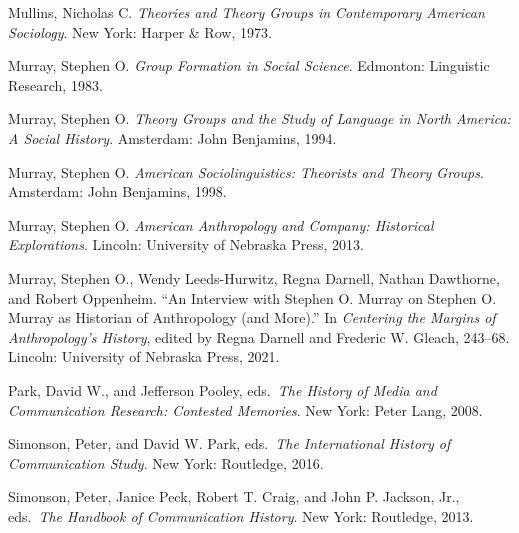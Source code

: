 \documentclass{tufte-handout}
\begin{document}
\begin{hangparas}{.25in}{1}
Mullins, Nicholas C. \emph{Theories and Theory Groups in Contemporary
American Sociology}. New York: Harper \& Row, 1973.

Murray, Stephen O. \emph{Group Formation in Social Science}. Edmonton:
Linguistic Research, 1983.

Murray, Stephen O. \emph{Theory Groups and the Study of Language in
North America: A Social History}. Amsterdam: John Benjamins, 1994.

Murray, Stephen O. \emph{American Sociolinguistics: Theorists and Theory
Groups}. Amsterdam: John Benjamins, 1998.

Murray, Stephen O. \emph{American Anthropology and Company: Historical
Explorations}. Lincoln: University of Nebraska Press, 2013.

Murray, Stephen O., Wendy Leeds-Hurwitz, Regna Darnell, Nathan
Dawthorne, and Robert Oppenheim. ``An Interview with Stephen O. Murray
on Stephen O. Murray as Historian of Anthropology (and More).'' In
\emph{Centering the Margins of Anthropology's History}, edited by Regna
Darnell and Frederic W. Gleach, 243--68. Lincoln: University of Nebraska
Press, 2021.

Park, David W., and Jefferson Pooley, eds.~\emph{The History of Media
and Communication Research: Contested Memories}. New York: Peter Lang,
2008.

Simonson, Peter, and David W. Park, eds.~\emph{The International History
of Communication Study}. New York: Routledge, 2016.

Simonson, Peter, Janice Peck, Robert T. Craig, and John P. Jackson, Jr.,
eds.~\emph{The Handbook of Communication History}. New York: Routledge,
2013.



\end{hangparas}
\end{document}
